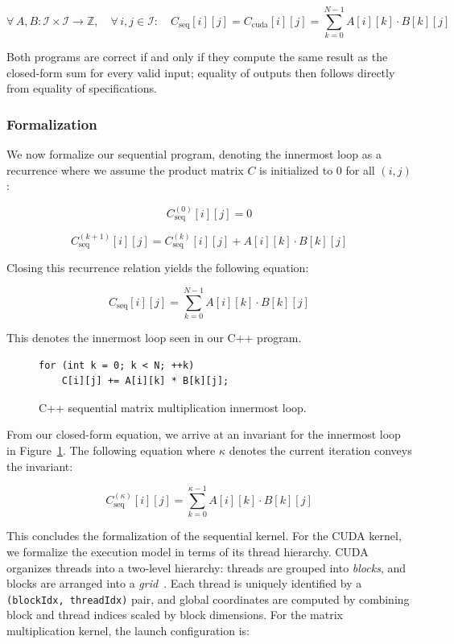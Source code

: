 \documentclass{article}
\begin{document}
$$\forall\, A, B : \mathcal{I} \times \mathcal{I} \to \mathbb{Z}, \quad \forall\, i, j \in \mathcal{I}: \quad C_{\text{seq}}[i][j] = C_{\text{cuda}}[i][j] = \sum_{k=0}^{N-1} A[i][k] \cdot B[k][j]$$

Both programs are correct if and only if they compute the same result as the closed-form sum for every valid input; equality of outputs then follows directly from equality of specifications.

\subsubsection{Formalization}

We now formalize our sequential program, denoting the innermost loop as a recurrence where we assume the product matrix $C$ is initialized to $0$ for all $(i,j)$:

$$C_{\text{seq}}^{(0)}[i][j] = 0$$

$$C_{\text{seq}}^{(k+1)}[i][j] = C_{\text{seq}}^{(k)}[i][j] + A[i][k] \cdot B[k][j]$$

Closing this recurrence relation yields the following equation: 

$$C_{\text{seq}}[i][j] = \sum_{k=0}^{N-1} A[i][k] \cdot B[k][j]$$

This denotes the innermost loop seen in our C++ program.

\begin{figure}[H]
\begin{verbatim}
for (int k = 0; k < N; ++k)
    C[i][j] += A[i][k] * B[k][j];
\end{verbatim}
\caption{C++ sequential matrix multiplication innermost loop.}
\label{fig:seq_mat_hotloop}
\end{figure}

From our closed-form equation, we arrive at an invariant for the innermost loop in Figure~\ref{fig:seq_mat_hotloop}. The following equation where $\kappa$ denotes the current iteration conveys the invariant:

$$C_{\text{seq}}^{(\kappa)}[i][j] = \sum_{k=0}^{\kappa - 1} A[i][k] \cdot B[k][j]$$

This concludes the formalization of the sequential kernel. For the CUDA kernel, we formalize the execution model in terms of its thread hierarchy. CUDA organizes threads into a two-level hierarchy: threads are grouped into \emph{blocks}, and blocks are arranged into a \emph{grid}~\cite{kirk2010programming}. Each thread is uniquely identified by a \texttt{(blockIdx, threadIdx)} pair, and global coordinates are computed by combining block and thread indices scaled by block dimensions. For the matrix multiplication kernel, the launch configuration is:
\end{document}
